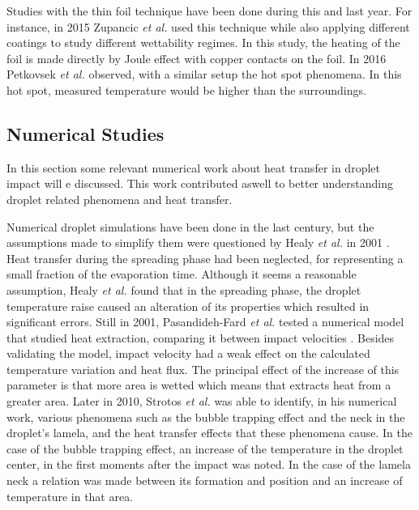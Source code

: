 \par Studies with the thin foil technique have been done during this and last year. For instance, in 2015 Zupancic \textit{et al.} used this technique while also applying different coatings to study different wettability regimes. In this study, the heating of the foil is made directly by Joule effect with copper contacts on the foil. In 2016 Petkovsek \textit{et al.} observed, with a similar setup the hot spot phenomena. In this hot spot, measured temperature would be higher than the surroundings. \\

\subsection{Numerical Studies}

\par In this section some relevant numerical work about heat transfer in droplet impact will e discussed. This work contributed aswell to better understanding droplet related phenomena and heat transfer.\\
\par Numerical droplet simulations have been done in the last century, but the assumptions made to simplify them were questioned by Healy \textit{et al.} in 2001 \cite{healy2001validity}. Heat transfer during the spreading phase had been neglected, for representing a small fraction of the evaporation time. Although it seems a reasonable assumption, Healy \textit{et al.} found that in the spreading phase, the droplet temperature raise caused an alteration of its properties which resulted in significant errors. Still in 2001, Pasandideh-Fard \textit{et al.} tested a numerical model that studied heat extraction, comparing it between impact velocities \cite{pasandideh2001cooling}. Besides validating the model, impact velocity had a weak effect on the calculated temperature variation and heat flux. The principal effect of the increase of this parameter is that more area is wetted which means that extracts heat from a greater area. Later in 2010, Strotos \textit{et al.} \cite{strotos2011non} was able to identify, in his numerical work, various phenomena such as the bubble trapping effect and the neck in the droplet's lamela, and the heat transfer effects that these phenomena cause. In the case of the bubble trapping effect, an increase of the temperature in the droplet center, in the first moments after the impact was noted. In the case of the lamela neck a relation was made between its formation and position and an increase of temperature in that area.


